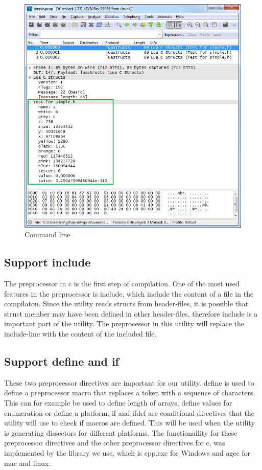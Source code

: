\begin{figure}[ht]
	\includegraphics[width=\textwidth]{./sprints/img/wireshark_simple}
	\caption{Command line\label{fig:sp1wsstruct}}
\end{figure}

\subsection{Support \gls{include}}
The \gls{preprocessor} in \Gls{c} is the first step of compilation. One of the most used 
features in the \gls{preprocessor} is \gls{include}, which include the content of a file 
in the compilaton. Since the \gls{utility} reads \glspl{struct} from \gls{header}-files, it is 
possible that \gls{struct} \gls{member} may have been defined in other \gls{header}-files, 
therefore \gls{include} is a important part of the \gls{utility}. The \gls{preprocessor} in 
this \gls{utility} will replace the \gls{include}-line with the content of the included file.

\subsection{Support \gls{define} and \gls{if}}
These two \gls{preprocessor} directives are important for our \gls{utility}. \gls{define} is 
used to define a \gls{preprocessor} macro that replaces a token with a 
sequence of characters. This can for example be used to define length of 
\glspl{array}, define values for enumeration or define a platform. \gls{if} and \gls{ifdef} 
are conditional directives that the \gls{utility} will use to check if macros are 
defined. This will be used when the \gls{utility} is generating \glspl{dissector} for 
different platforms. The functionallity for these \gls{preprocessor} directives and 
the other \gls{preprocessor} directives for \Gls{c}, was implemented by the \gls{library} we 
use, which is cpp.exe for \Gls{Windows} and \gls{agcc} for \Gls{mac} and \Gls{linux}.

